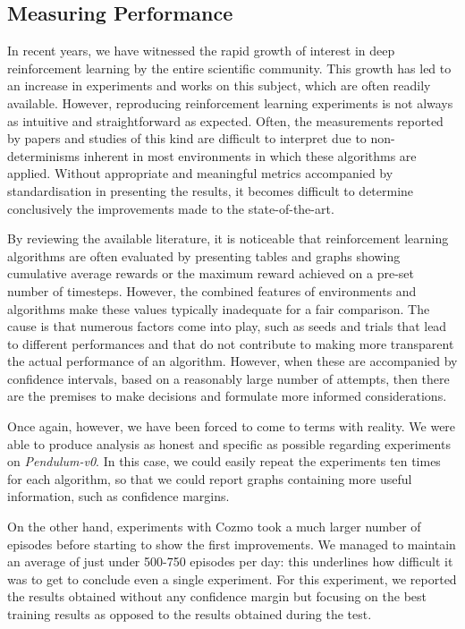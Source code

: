\subsection{Measuring Performance}

In recent years, we have witnessed the rapid growth of interest in deep reinforcement learning by the entire scientific community.
This growth has led to an increase in experiments and works on this subject, which are often readily available.
However, reproducing reinforcement learning experiments is not always as intuitive and straightforward as expected.
Often, the measurements reported by papers and studies of this kind are difficult to interpret due to non-determinisms inherent in most environments in which these algorithms are applied.
Without appropriate and meaningful metrics accompanied by standardisation in presenting the results, it becomes difficult to determine conclusively the improvements made to the state-of-the-art.

By reviewing the available literature, it is noticeable that reinforcement learning algorithms are often evaluated by presenting tables and graphs showing cumulative average rewards or the maximum reward achieved on a pre-set number of timesteps.
However, the combined features of environments and algorithms make these values typically inadequate for a fair comparison.
The cause is that numerous factors come into play, such as seeds and trials that lead to different performances and that do not contribute to making more transparent the actual performance of an algorithm.
However, when these are accompanied by confidence intervals, based on a reasonably large number of attempts, then there are the premises to make decisions and formulate more informed considerations.

Once again, however, we have been forced to come to terms with reality.
We were able to produce analysis as honest and specific as possible regarding experiments on \textit{Pendulum-v0}.
In this case, we could easily repeat the experiments ten times for each algorithm, so that we could report graphs containing more useful information, such as confidence margins.

On the other hand, experiments with Cozmo took a much larger number of episodes before starting to show the first improvements.
We managed to maintain an average of just under 500-750 episodes per day: this underlines how difficult it was to get to conclude even a single experiment.
For this experiment, we reported the results obtained without any confidence margin but focusing on the best training results as opposed to the results obtained during the test.

